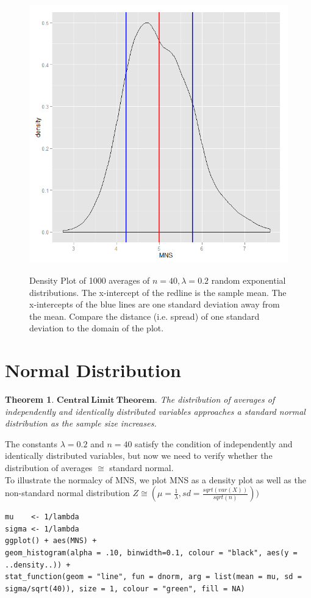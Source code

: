 \documentclass[11pt]{article} %
\newtheorem{theorem}{Theorem}[section]
\begin{document}
\begin{figure}
  \centering
\caption{\footnotesize Density Plot of 1000 averages of $n = 40, \lambda = 0.2$ random exponential distributions. The x-intercept of the redline is the sample mean. The x-intercepts of the blue lines are one standard deviation away from the mean. Compare the distance (i.e. spread) of one standard deviation to the domain of the plot.}
  \includegraphics[scale = 0.45]{figure2}
	\label{Figure 2.}
\end{figure}

\section{Normal Distribution}

\begin{theorem}
	$\mathbf{Central \> Limit \> Theorem.}$ The distribution of averages of independently and identically distributed variables approaches a standard normal distribution as the sample size increases. 
\end{theorem}
	The constants $\lambda = 0.2$ and $n = 40$ satisfy the condition of independently and identically distributed variables, but now we need to verify whether the distribution of averages $\cong$ standard normal. \\

To illustrate the normalcy of MNS, we plot MNS as a density plot as well as the non-standard normal distribution $Z \cong (\mu = \frac{1}{\lambda}, sd = \frac{sqrt(var(X))}{sqrt(n)})) $ \\
\begin{lstlisting}
mu    <- 1/lambda
sigma <- 1/lambda
ggplot() + aes(MNS) + 
geom_histogram(alpha = .10, binwidth=0.1, colour = "black", aes(y = ..density..)) +
stat_function(geom = "line", fun = dnorm, arg = list(mean = mu, sd = sigma/sqrt(40)), size = 1, colour = "green", fill = NA)
\end{lstlisting}
\end{document}

